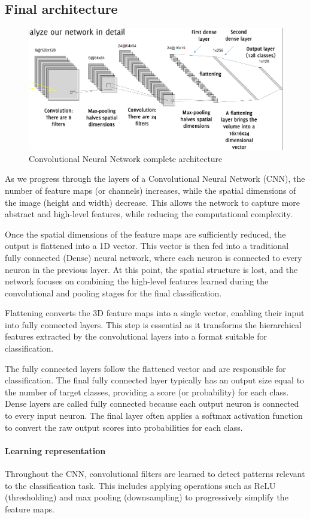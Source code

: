 \subsection{Final architecture}
\begin{figure}[H]
    \centering
    \includegraphics[width=0.5\linewidth]{images/cnn1.png}
    \caption{Convolutional Neural Network complete architecture}
\end{figure}
As we progress through the layers of a Convolutional Neural Network (CNN), the number of feature maps (or channels) increases, while the spatial dimensions of the image (height and width) decrease. 
This allows the network to capture more abstract and high-level features, while reducing the computational complexity.

Once the spatial dimensions of the feature maps are sufficiently reduced, the output is flattened into a 1D vector. 
This vector is then fed into a traditional fully connected (Dense) neural network, where each neuron is connected to every neuron in the previous layer. 
At this point, the spatial structure is lost, and the network focuses on combining the high-level features learned during the convolutional and pooling stages for the final classification.

Flattening converts the 3D feature maps into a single vector, enabling their input into fully connected layers.
This step is essential as it transforms the hierarchical features extracted by the convolutional layers into a format suitable for classification.

The fully connected layers follow the flattened vector and are responsible for classification. 
The final fully connected layer typically has an output size equal to the number of target classes, providing a score (or probability) for each class.
Dense layers are called fully connected because each output neuron is connected to every input neuron.
The final layer often applies a softmax activation function to convert the raw output scores into probabilities for each class.

\paragraph*{Learning representation}
Throughout the CNN, convolutional filters are learned to detect patterns relevant to the classification task. 
This includes applying operations such as ReLU (thresholding) and max pooling (downsampling) to progressively simplify the feature maps.

